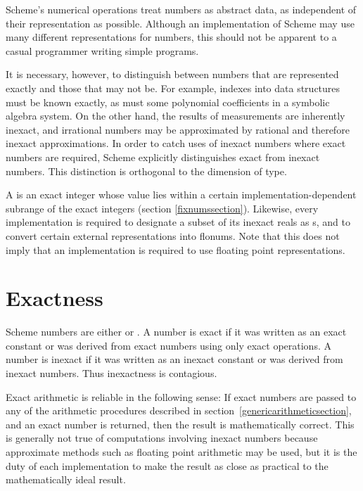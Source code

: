 Scheme's numerical operations treat numbers as abstract data, as
independent of their representation as possible.  Although an implementation
of Scheme may use many different representations for
numbers, this should not be apparent to a casual programmer writing
simple programs.

It is necessary, however, to distinguish between numbers that are
represented exactly and those that may not be.  For example, indexes
into data structures must be known exactly, as must some polynomial
coefficients in a symbolic algebra system.  On the other hand, the
results of measurements are inherently inexact, and irrational numbers
may be approximated by rational and therefore inexact approximations.
In order to catch uses of inexact numbers where exact numbers are
required, Scheme explicitly distinguishes exact from inexact numbers.
This distinction is orthogonal to the dimension of type.

A  is an exact integer whose value lies
within a certain implementation-dependent subrange of the
exact integers (section \ref{fixnumssection}).
Likewise, every implementation is required
to designate a subset of its inexact reals as s, and
to convert certain external representations into flonums.  Note that
this does not imply that an implementation is required to use
floating point representations.

\section{Exactness}
\label{exactly}

 Scheme numbers are either  or
.  A number is exact if it was written as an exact
constant or was derived from exact numbers using only exact
operations.  A number is inexact if it was written as an inexact
constant or was derived from inexact numbers.  Thus inexactness is
contagious.  

Exact arithmetic is reliable in the following sense:
If exact numbers are passed to any of the arithmetic procedures
described in section~\ref{genericarithmeticsection}, and an
exact number is returned, then the result is mathematically
correct.
This is generally not true of
computations involving inexact numbers because approximate methods
such as floating point arithmetic may be used, but it is the duty of
each implementation to make the result as close as practical to the
mathematically ideal result.

